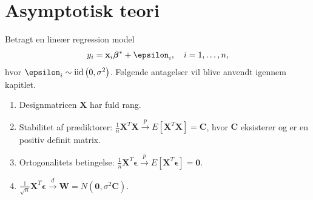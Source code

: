 \section{Asymptotisk teori}
Betragt en lineær regression model 
\begin{align*}
y_i= \mathbf{x}_i \tbeta^* + \epsilon_i, \quad i = 1, \ldots, n,
\end{align*}
hvor \(\epsilon_i \sim \text{iid} \del{0, \sigma^2}\).
Følgende antagelser vil blive anvendt igennem kapitlet. \\[2mm]
\begin{ass} \label{ass:konsistens}
\begin{enumerate}[label=\alph*)]
\item Designmatricen $\textbf{X}$ har fuld rang.
\item Stabilitet af prædiktorer:
$\frac{1}{n} \textbf{X}^T \textbf{X} \overset{p}{\rightarrow} E[\textbf{X}^T \textbf{X}] = \textbf{C}$, hvor $\textbf{C}$ eksisterer og er en positiv definit matrix.  
\item Ortogonalitets betingelse:
$\frac{1}{n} \textbf{X}^T \boldsymbol{\epsilon} \overset{p}{\rightarrow} E[\textbf{X}^T \boldsymbol{\epsilon}] = \textbf{0} $.
\item $\frac{1}{\sqrt{n}} \mathbf{X}^T \boldsymbol{\epsilon} \overset{d}{\rightarrow} \mathbf{W}=N(\mathbf{0},\sigma^2 \mathbf{C})$.
\end{enumerate}
\end{ass}


